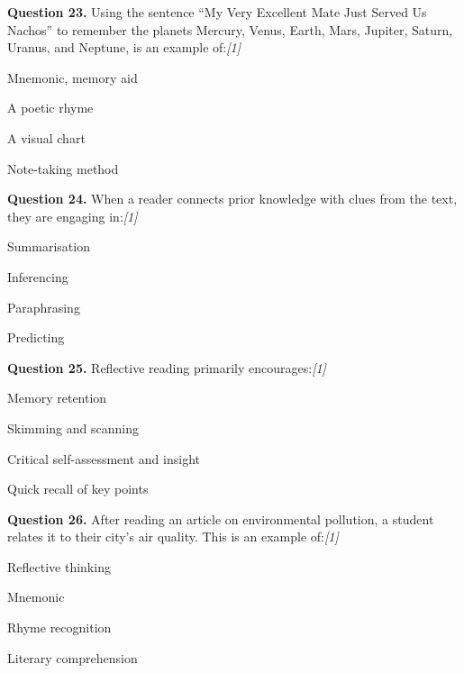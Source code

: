 \documentclass[11pt,a4paper]{article}
\newcommand{\pts}[1]{\hfill \textit{[#1]}}
\begin{document}
\noindent \textbf{Question 23.} Using the sentence ``My Very Excellent Mate Just Served Us Nachos'' to remember the planets Mercury, Venus, Earth, Mars, Jupiter, Saturn, Uranus, and Neptune, is an example of:\pts{1}

\begin{parts}
  \item Mnemonic, memory aid
  \item A poetic rhyme
  \item A visual chart
  \item Note-taking method
\end{parts}

\medskip




\noindent \textbf{Question 24.} When a reader connects prior knowledge with clues from the text, they are engaging in:\pts{1}

\begin{parts}
  \item Summarisation
  \item Inferencing
  \item Paraphrasing
  \item Predicting
\end{parts}

\medskip




\noindent \textbf{Question 25.} Reflective reading primarily encourages:\pts{1}

\begin{parts}
  \item Memory retention
  \item Skimming and scanning
  \item Critical self-assessment and insight
  \item Quick recall of key points
\end{parts}

\medskip




\noindent \textbf{Question 26.} After reading an article on environmental pollution, a student relates it to their city's air quality. This is an example of:\pts{1}

\begin{parts}
  \item Reflective thinking
  \item Mnemonic
  \item Rhyme recognition
  \item Literary comprehension
\end{parts}
\end{document}
